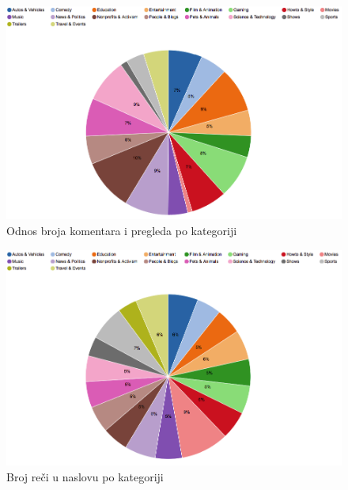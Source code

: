 \documentclass[a4paper]{article}
\theoremstyle{definition}
\begin{document}
\begin{figure}[H]
\begin{center}
    \includegraphics[width=1\textwidth]{categories_perc-title.png}
    \caption{Odnos broja komentara i pregleda po kategoriji }
\end{center}
\end{figure}

\begin{figure}[H]
\begin{center}
    \includegraphics[width=1\textwidth]{categories_title.png}
    \caption{Broj reči u naslovu po kategoriji}
\end{center}
\end{figure}
\end{document}
